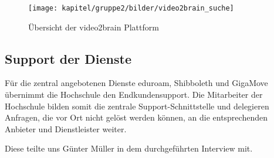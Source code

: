\begin{figure}[h!]
	\centering
	\texttt{[image: kapitel/gruppe2/bilder/video2brain\_suche]}
	\caption{Übersicht der video2brain Plattform \protect\footnotemark}
	\label{fig_video2brain_suchergebnis}
\end{figure}

\subsection{Support der Dienste}
Für die zentral angebotenen Dienste eduroam, Shibboleth und GigaMove übernimmt die Hochschule den Endkundensupport. Die Mitarbeiter der Hochschule bilden somit die zentrale Support-Schnittstelle und delegieren Anfragen, die vor Ort nicht gelöst werden können, an die entsprechenden Anbieter und Dienstleister weiter.

Diese teilte uns Günter Müller in dem durchgeführten Interview mit.